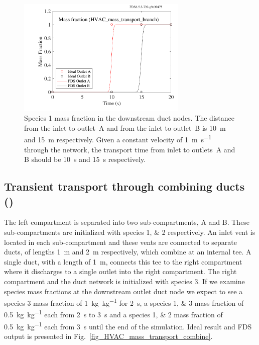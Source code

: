 \documentclass[11pt]{book}
\begin{document}
\begin{figure}[ht]
\centering
\includegraphics[width=3.2in]{SCRIPT_FIGURES/HVAC_mass_transport_branch}
\caption[ test case.]{Species \num{1} mass fraction in the downstream duct nodes. The distance from the inlet to outlet~A and from the inlet to outlet~B is \SI{10}{\meter} and \SI{15}{\meter} respectively. Given a constant velocity of \SI[per-mode=symbol]{1}{\meter\per\second} through the network, the transport time from inlet to outlets~A and B should be \SI{10}{\second} and \SI{15}{\second} respectively.}
\label{fig_HVAC_mass_transport_branch}
\end{figure}

\subsection{Transient transport through combining ducts (\texorpdfstring{}{HVAC\_mass\_transport\_combine})}
\label{HVAC_mass_transport_combine}
The left compartment is separated into two sub-compartments, A and B. These sub-compartments are initialized with species \numlist{1;2} respectively. An inlet vent is located in each sub-compartment and these vents are connected to separate ducts, of lengths \SI{1}{\meter} and \SI{2}{\meter} respectively, which combine at an internal tee. A single duct, with a length of \SI{1}{\meter}, connects this tee to the right compartment where it discharges to a single outlet into the right compartment. The right compartment and the duct network is initialized with species \num{3}. If we examine species mass fractions at the downstream outlet duct node we expect to see a species \num{3} mass fraction of \SI[per-mode=symbol]{1}{\kilogram\per\kilogram} for \SI{2}{\second}, a species \numlist{1;3} mass fraction of \SI[per-mode=symbol]{0.5}{\kilogram\per\kilogram} each from \SI{2}{\second} to \SI{3}{\second} and a species \numlist{1;2} mass fraction of \SI[per-mode=symbol]{0.5}{\kilogram\per\kilogram} each from \SI{3}{\second} until the end of the simulation. Ideal result and FDS output is presented in Fig.~\ref{fig_HVAC_mass_transport_combine}.
\end{document}
